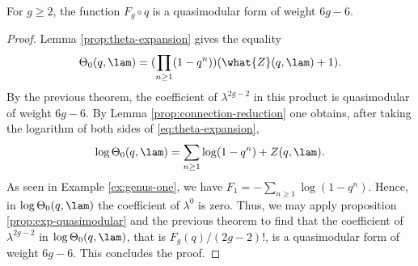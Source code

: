 \begin{thm}[Dijkgraaf]
 For $g\geq 2$, the function $F_g\circ q$ is a quasimodular form of weight $6g-6$.
\end{thm}
\begin{proof}
 Lemma \ref{prop:theta-expansion} gives the equality
 \begin{equation} \label{eq:theta-expansion}
  \Theta_0(q,\lam)=(\prod_{n\geq 1}(1-q^n))(\what{Z}(q,\lam)+1).
 \end{equation}
 By the previous theorem, the coefficient of $\lambda^{2g-2}$ in this product is quasimodular of weight $6g-6$. By Lemma \ref{prop:connection-reduction} one obtains, after taking the logarithm of both sides of \eqref{eq:theta-expansion},
 \[
  \log\Theta_0(q,\lam)=\sum_{n\geq 1}\log(1-q^n) + Z(q,\lam).
 \]
 As seen in Example \ref{ex:genus-one}, we have $F_1=-\sum_{n\geq 1}\log(1-q^n)$. Hence, in $\log\Theta_0(q,\lam)$ the coefficient of $\lambda^0$ is zero. Thus, we may apply proposition \ref{prop:exp-quasimodular} and the previous theorem to find that the coefficient of $\lambda^{2g-2}$ in $\log\Theta_0(q,\lam)$, that is $F_g(q)/(2g-2)!$, is a quasimodular form of weight $6g-6$. This concludes the proof.
\end{proof}